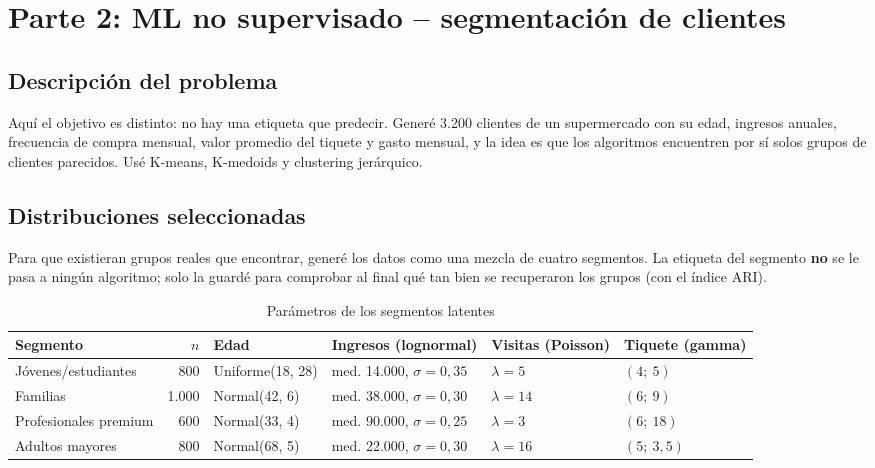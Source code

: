 \documentclass[11pt,letterpaper]{article}
\begin{document}
\section{Parte 2: ML no supervisado -- segmentación de clientes}

\subsection{Descripción del problema}

Aquí el objetivo es distinto: no hay una etiqueta que predecir. Generé 3.200 clientes de un supermercado con
su edad, ingresos anuales, frecuencia de compra mensual, valor promedio del tiquete y gasto mensual, y la
idea es que los algoritmos encuentren por sí solos grupos de clientes parecidos. Usé K-means, K-medoids y
clustering jerárquico.

\subsection{Distribuciones seleccionadas}

Para que existieran grupos reales que encontrar, generé los datos como una mezcla de cuatro segmentos. La
etiqueta del segmento \textbf{no} se le pasa a ningún algoritmo; solo la guardé para comprobar al final qué
tan bien se recuperaron los grupos (con el índice ARI).

\begin{table}[H]
\centering
\caption{Parámetros de los segmentos latentes}
\footnotesize
\setlength{\tabcolsep}{3.5pt}
\begin{tabular}{lrllll}
\toprule
\textbf{Segmento} & \textbf{$n$} & \textbf{Edad} & \textbf{Ingresos (lognormal)} & \textbf{Visitas (Poisson)} & \textbf{Tiquete (gamma)} \\
\midrule
Jóvenes/estudiantes   & 800   & Uniforme(18, 28) & med. 14.000, $\sigma=0{,}35$ & $\lambda=5$  & $(4;\ 5)$ \\
Familias              & 1.000 & Normal(42, 6)    & med. 38.000, $\sigma=0{,}30$ & $\lambda=14$ & $(6;\ 9)$ \\
Profesionales premium & 600   & Normal(33, 4)    & med. 90.000, $\sigma=0{,}25$ & $\lambda=3$  & $(6;\ 18)$ \\
Adultos mayores       & 800   & Normal(68, 5)    & med. 22.000, $\sigma=0{,}30$ & $\lambda=16$ & $(5;\ 3{,}5)$ \\
\bottomrule
\end{tabular}
\end{table}
\end{document}
